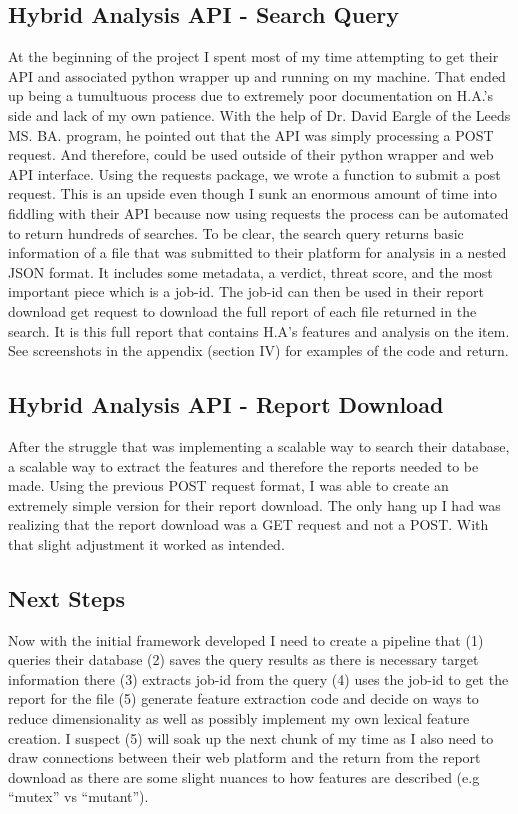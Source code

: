 \documentclass[conference]{IEEEtran}
\begin{document}
\subsection{Hybrid Analysis API - Search Query}

At the beginning of the project I spent most of my time attempting to get their API and associated python wrapper up and running on my machine. That ended up being a tumultuous process due to extremely poor documentation on H.A.’s side and lack of my own patience. With the help of Dr. David Eargle of the Leeds MS. BA. program, he pointed out that the API was simply processing a POST request. And therefore, could be used outside of their python wrapper and web API interface. Using the requests package, we wrote a function to submit a post request. This is an upside even though I sunk an enormous amount of time into fiddling with their API because now using requests the process can be automated to return hundreds of searches. To be clear, the search query returns basic information of a file that was submitted to their platform for analysis in a nested JSON format. It includes some metadata, a verdict, threat score, and the most important piece which is a job-id. The job-id can then be used in their report download get request to download the full report of each file returned in the search. It is this full report that contains H.A’s features and analysis on the item. See screenshots in the appendix (section IV) for examples of the code and return.

\subsection{Hybrid Analysis API - Report Download}

After the struggle that was implementing a scalable way to search their database, a scalable way to extract the features and therefore the reports needed to be made. Using the previous POST request format, I was able to create an extremely simple version for their report download. The only hang up I had was realizing that the report download was a GET request and not a POST. With that slight adjustment it worked as intended.

\subsection{Next Steps}

Now with the initial framework developed I need to create a pipeline that (1) queries their database (2) saves the query results as there is necessary target information there (3) extracts job-id from the query (4) uses the job-id to get the report for the file (5) generate feature extraction code and decide on ways to reduce dimensionality as well as possibly implement my own lexical feature creation. I suspect (5) will soak up the next chunk of my time as I also need to draw connections between their web platform and the return from the report download as there are some slight nuances to how features are described (e.g “mutex” vs “mutant”).
\end{document}
